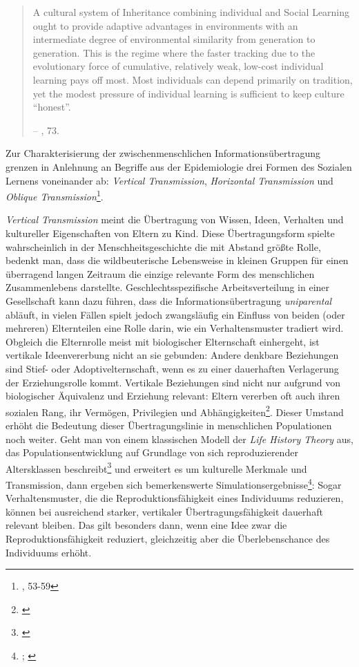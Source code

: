 \documentclass[openany,twoside,twocolumn]{book}
\let\rmarkdownfootnote\footnote%
\def\footnote{\protect\rmarkdownfootnote}
\begin{document}
\begin{quote}
A cultural system of Inheritance combining individual and Social
Learning ought to provide adaptive advantages in environments with an
intermediate degree of environmental similarity from generation to
generation. This is the regime where the faster tracking due to the
evolutionary force of cumulative, relatively weak, low-cost individual
learning pays off most. Most individuals can depend primarily on
tradition, yet the modest pressure of individual learning is sufficient
to keep culture ``honest''.

-- \textcite{smith_cultural_1992}, 73.
\end{quote}

Zur Charakterisierung der zwischenmenschlichen Informationsübertragung
grenzen \textcite{cavalli-sforza_cultural_1981} in Anlehnung an Begriffe
aus der Epidemiologie drei Formen des Sozialen Lernens voneinander ab:
\emph{Vertical Transmission}, \emph{Horizontal Transmission} und
\emph{Oblique Transmission}\footnote{\textcite{cavalli-sforza_cultural_1981},
  53-59}.

\emph{Vertical Transmission} meint die Übertragung von Wissen, Ideen,
Verhalten und kultureller Eigenschaften von Eltern zu Kind. Diese
Übertragungsform spielte wahrscheinlich in der Menschheitsgeschichte die
mit Abstand größte Rolle, bedenkt man, dass die wildbeuterische
Lebensweise in kleinen Gruppen für einen überragend langen Zeitraum die
einzige relevante Form des menschlichen Zusammenlebens darstellte.
Geschlechtsspezifische Arbeitsverteilung in einer Gesellschaft kann dazu
führen, dass die Informationsübertragung \emph{uniparental} abläuft, in
vielen Fällen spielt jedoch zwangsläufig ein Einfluss von beiden (oder
mehreren) Elternteilen eine Rolle darin, wie ein Verhaltensmuster
tradiert wird. Obgleich die Elternrolle meist mit biologischer
Elternschaft einhergeht, ist vertikale Ideenvererbung nicht an sie
gebunden: Andere denkbare Beziehungen sind Stief- oder
Adoptivelternschaft, wenn es zu einer dauerhaften Verlagerung der
Erziehungsrolle kommt. Vertikale Beziehungen sind nicht nur aufgrund von
biologischer Äquivalenz und Erziehung relevant: Eltern vererben oft auch
ihren sozialen Rang, ihr Vermögen, Privilegien und
Abhängigkeiten\footnote{\textcite{mulder_intergenerational_2009}}.
Dieser Umstand erhöht die Bedeutung dieser Übertragungslinie in
menschlichen Populationen noch weiter. Geht man von einem klassischen
Modell der \emph{Life History Theory} aus, das Populationsentwicklung
auf Grundlage von sich reproduzierender Altersklassen
beschreibt\footnote{\textcite{leslie_further_1948}} und erweitert es um
kulturelle Merkmale und Transmission, dann ergeben sich bemerkenswerte
Simulationsergebnisse\footnote{\textcite{coratenuto_age_1989};
  \textcite{fogarty_role_2013}}: Sogar Verhaltensmuster, die die
Reproduktionsfähigkeit eines Individuums reduzieren, können bei
ausreichend starker, vertikaler Übertragungsfähigkeit dauerhaft relevant
bleiben. Das gilt besonders dann, wenn eine Idee zwar die
Reproduktionsfähigkeit reduziert, gleichzeitig aber die Überlebenschance
des Individuums erhöht.
\end{document}
